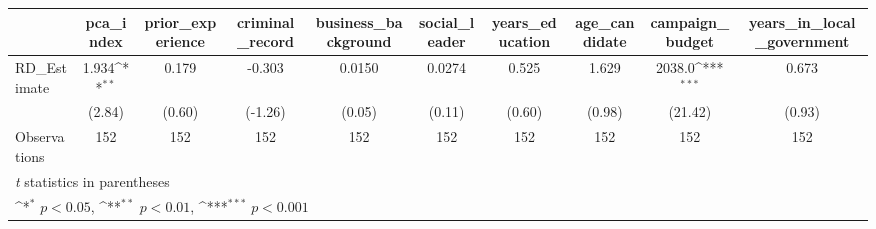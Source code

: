 \def\sym#1{\ifmmode^{#1}\else\(^{#1}\)\fi}
\begin{adjustbox}{max
width={\textwidth},caption={Candidate characteristic RDD analysis\label{tab:characteristics}},nofloat=table}
\begin{tabular}{l*{9}{c}}
\toprule
                    &\multicolumn{1}{c}{pca\_index}&\multicolumn{1}{c}{prior\_experience}&\multicolumn{1}{c}{criminal\_record}&\multicolumn{1}{c}{business\_background}&\multicolumn{1}{c}{social\_leader}&\multicolumn{1}{c}{years\_education}&\multicolumn{1}{c}{age\_candidate}&\multicolumn{1}{c}{campaign\_budget}&\multicolumn{1}{c}{years\_in\_local\_government}\\
\midrule
RD\_Estimate         &       1.934\sym{**} &       0.179         &      -0.303         &      0.0150         &      0.0274         &       0.525         &       1.629         &      2038.0\sym{***}&       0.673         \\
                    &      (2.84)         &      (0.60)         &     (-1.26)         &      (0.05)         &      (0.11)         &      (0.60)         &      (0.98)         &     (21.42)         &      (0.93)         \\
\midrule
Observations        &         152         &         152         &         152         &         152         &         152         &         152         &         152         &         152         &         152         \\
\bottomrule
\multicolumn{10}{p{\textwidth}}{\centering \footnotesize \textit{t} statistics in parentheses}\\
\multicolumn{10}{p{\textwidth}}{\centering \footnotesize \sym{*} \(p<0.05\), \sym{**} \(p<0.01\), \sym{***} \(p<0.001\)}\\
\end{tabular}\end{adjustbox}
